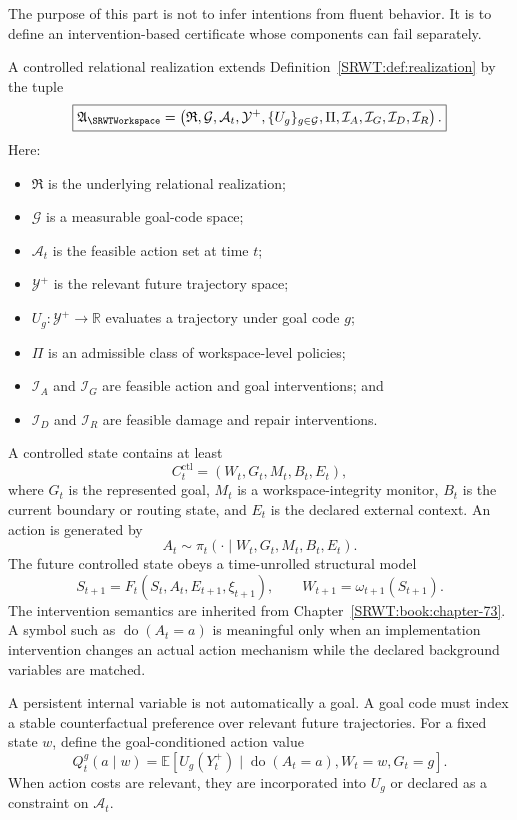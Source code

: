 The purpose of this part is not to infer intentions from fluent behavior. It
is to define an intervention-based certificate whose components can fail
separately.


A controlled relational realization extends Definition~\ref{SRWT:def:realization}
by the tuple
\[
\boxed{
\mathfrak A_{\SRWTWorkspace}
=
\left(
\mathfrak R,
\mathcal G,
\mathcal A_t,
\mathcal Y^+,
\{U_g\}_{g\in\mathcal G},
\Pi,
\mathcal I_A,
\mathcal I_G,
\mathcal I_D,
\mathcal I_R
\right).
}
\]
Here:
\begin{itemize}
\item \(\mathfrak R\) is the underlying relational realization;
\item \(\mathcal G\) is a measurable goal-code space;
\item \(\mathcal A_t\) is the feasible action set at time \(t\);
\item \(\mathcal Y^+\) is the relevant future trajectory space;
\item \(U_g:\mathcal Y^+\to\mathbb R\) evaluates a trajectory under goal
 code \(g\);
\item \(\Pi\) is an admissible class of workspace-level policies;
\item \(\mathcal I_A\) and \(\mathcal I_G\) are feasible action and goal
 interventions; and
\item \(\mathcal I_D\) and \(\mathcal I_R\) are feasible damage and repair
 interventions.
\end{itemize}

A controlled state contains at least
\[
C_t^{\mathrm{ctl}}
=
\left(
W_t,G_t,M_t,B_t,E_t
\right),
\]
where \(G_t\) is the represented goal, \(M_t\) is a workspace-integrity
monitor, \(B_t\) is the current boundary or routing state, and \(E_t\) is the
declared external context. An action is generated by
\[
A_t
\sim
\pi_t
\left(
\cdot\mid W_t,G_t,M_t,B_t,E_t
\right).
\]
The future controlled state obeys a time-unrolled structural model
\[
S_{t+1}
=
F_t(S_t,A_t,E_{t+1},\xi_{t+1}),
\qquad
W_{t+1}=\omega_{t+1}(S_{t+1}).
\]
The intervention semantics are inherited from Chapter~\ref{SRWT:book:chapter-73}. A symbol such as
\(\operatorname{do}(A_t=a)\) is meaningful only when an implementation
intervention changes an actual action mechanism while the declared background
variables are matched.


A persistent internal variable is not automatically a goal. A goal code must
index a stable counterfactual preference over relevant future trajectories.
For a fixed state \(w\), define the goal-conditioned action value
\[
Q_t^g(a\mid w)
=
\mathbb E
\left[
U_g(Y_t^+)
\mid
\operatorname{do}(A_t=a),
W_t=w,
G_t=g
\right].
\]
When action costs are relevant, they are incorporated into \(U_g\) or declared
as a constraint on \(\mathcal A_t\).


